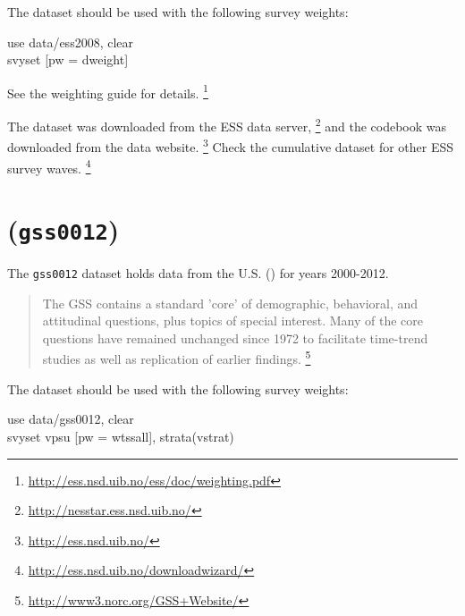 The \ESS dataset should be used with the following survey weights:

\begin{docspec}
	use data/ess2008, clear\\
	svyset [pw = dweight]
\end{docspec}

See the \ESS weighting guide for details.%
  \footnote{\url{http://ess.nsd.uib.no/ess/doc/weighting.pdf}}

The dataset was downloaded from the ESS data server,%
  \footnote{\url{http://nesstar.ess.nsd.uib.no/}} %
  and the codebook was downloaded from the \ESS data website.%
  \footnote{\url{http://ess.nsd.uib.no/}} %
  Check the cumulative dataset for other ESS survey waves.%
  \footnote{\url{http://ess.nsd.uib.no/downloadwizard/}}

\section*{\gss (\texttt{gss0012})}

The \texttt{gss0012} dataset holds data from the U.S. \gss (\GSS) for years 2000-2012.

\begin{quote}
	The GSS contains a standard 'core' of demographic, behavioral, and attitudinal questions, plus topics of special interest. Many of the core questions have remained unchanged since 1972 to facilitate time-trend studies as well as replication of earlier findings.%
	\footnote{\url{http://www3.norc.org/GSS+Website/}}
\end{quote}

The \GSS dataset should be used with the following survey weights:

\begin{docspec}
	use data/gss0012, clear\\
	svyset vpsu [pw = wtssall], strata(vstrat)
\end{docspec}

